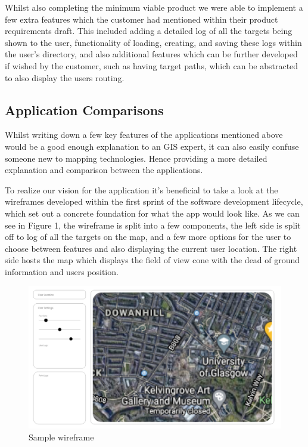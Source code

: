 \documentclass{l3proj}
\begin{document}
Whilst also completing the minimum viable product we were able to implement a few extra features which the customer had mentioned within their product requirements draft. This included adding a detailed log of all the targets being shown to the user, functionality of loading, creating, and saving these logs within the user's directory, and also additional features which can be further developed if wished by the customer, such as having target paths, which can be abstracted to also display the users routing.

\subsection{Application Comparisons}

Whilst writing down a few key features of the applications mentioned above would be a good enough explanation to an GIS expert, it can also easily confuse someone new to mapping technologies. Hence providing a more detailed explanation and comparison between the applications.

To realize our vision for the application it's beneficial to take a look at the wireframes developed within the first sprint of the software development lifecycle, which set out a concrete foundation for what the app would look like. As we can see in Figure 1, the wireframe is split into a few components, the left side is split off to log of all the targets on the map, and a few more options for the user to choose between features and also displaying the current user location. The right side hosts the map which displays the field of view cone with the dead of ground information and users position.

\begin{figure}[h]
    \caption{Sample wireframe}
    \centering
    \includegraphics[width=\textwidth]{wireframe.jpg}
\end{figure}
\end{document}

